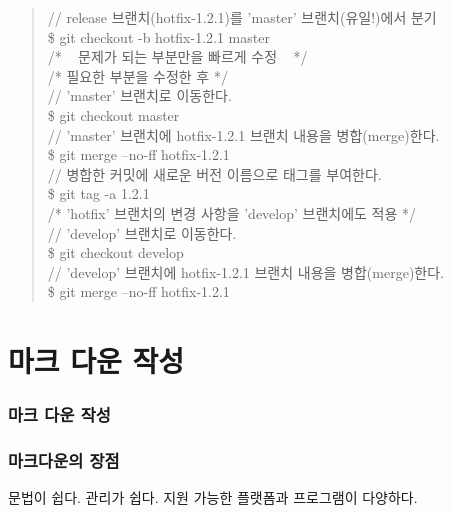 \documentclass[12pt, a4paper, oneside]{book}
\let\stdsection\section
\renewcommand\section{\newpage\stdsection}
\begin{document}
		\begin{tcolorbox}
		\begin{quote}
			// release 브랜치(hotfix-1.2.1)를 'master' 브랜치(유일!)에서 분기\\
			\$ git checkout -b hotfix-1.2.1 master \\
			/* ~ 문제가 되는 부분만을 빠르게 수정 ~ */ \\
			/* 필요한 부분을 수정한 후 */ \\
			// 'master' 브랜치로 이동한다.  \\
			\$ git checkout master \\
			// 'master' 브랜치에 hotfix-1.2.1 브랜치 내용을 병합(merge)한다.  \\
			\$ git merge --no-ff hotfix-1.2.1 \\
			// 병합한 커밋에 새로운 버전 이름으로 태그를 부여한다. \\
			\$ git tag -a 1.2.1  \\
			/* 'hotfix' 브랜치의 변경 사항을 'develop' 브랜치에도 적용 */  \\
			// 'develop' 브랜치로 이동한다.  \\
			\$ git checkout develop  \\
			// 'develop' 브랜치에 hotfix-1.2.1 브랜치 내용을 병합(merge)한다.  \\
			\$ git merge --no-ff hotfix-1.2.1  \\
		\end{quote}
		\end{tcolorbox}



	\part 	{마크 다운 작성 }
	\noptcrule
	\parttoc				

			
				\section{마크 다운 작성}
			
			
				\section{마크다운의 장점}
				문법이 쉽다.
				관리가 쉽다.
				지원 가능한 플랫폼과 프로그램이 다양하다.
			
\end{document}
